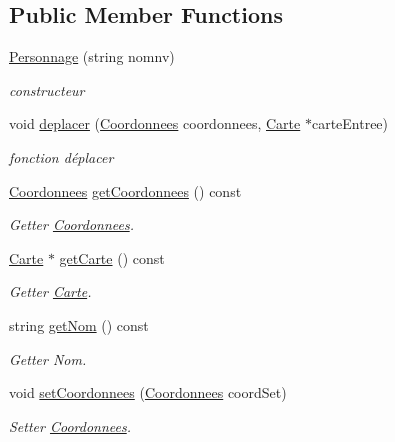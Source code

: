 \subsection*{Public Member Functions}
\begin{DoxyCompactItemize}
\item 
\hyperlink{classPersonnage_a93723cd22a0b4c2e6edd62e07e09a745}{Personnage} (string nomnv)
\begin{DoxyCompactList}\small\item\em constructeur \end{DoxyCompactList}\item 
void \hyperlink{classPersonnage_a91f650f5ede9c187560dd5c03907b337}{deplacer} (\hyperlink{classCoordonnees}{Coordonnees} coordonnees, \hyperlink{classCarte}{Carte} $\ast$carte\-Entree)
\begin{DoxyCompactList}\small\item\em fonction déplacer \end{DoxyCompactList}\item 
\hyperlink{classCoordonnees}{Coordonnees} \hyperlink{classPersonnage_ae66327fd2d09e133d049f96e6b3a68cf}{get\-Coordonnees} () const 
\begin{DoxyCompactList}\small\item\em Getter \hyperlink{classCoordonnees}{Coordonnees}. \end{DoxyCompactList}\item 
\hyperlink{classCarte}{Carte} $\ast$ \hyperlink{classPersonnage_a9c4fd5657f04f3b9defc603fc05b99da}{get\-Carte} () const 
\begin{DoxyCompactList}\small\item\em Getter \hyperlink{classCarte}{Carte}. \end{DoxyCompactList}\item 
string \hyperlink{classPersonnage_ad05ce70497e8321d81795776a5b77948}{get\-Nom} () const 
\begin{DoxyCompactList}\small\item\em Getter Nom. \end{DoxyCompactList}\item 
void \hyperlink{classPersonnage_a13269350d46d0a5a32454b51b5dce7af}{set\-Coordonnees} (\hyperlink{classCoordonnees}{Coordonnees} coord\-Set)
\begin{DoxyCompactList}\small\item\em Setter \hyperlink{classCoordonnees}{Coordonnees}. \end{DoxyCompactList}\item 

\end{DoxyCompactItemize}
